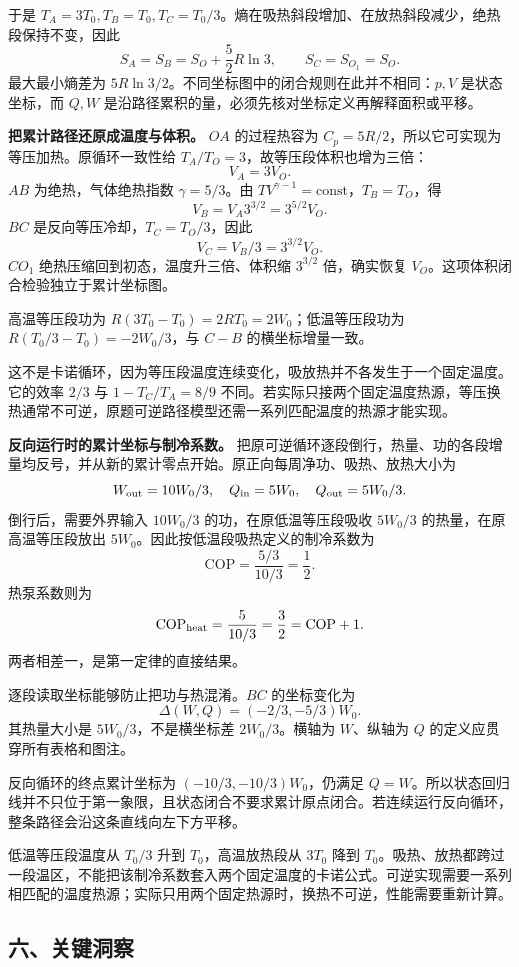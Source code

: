 \documentclass[12pt,a4paper,UTF8]{ctexart}
\begin{document}
于是
\(T_A=3T_0,T_B=T_0,T_C=T_0/3\)。熵在吸热斜段增加、在放热斜段减少，绝热段保持不变，因此
\[
S_A=S_B=S_O+\frac52R\ln3,
\qquad S_C=S_{O_1}=S_O.
\] 最大最小熵差为
\(5R\ln3/2\)。不同坐标图中的闭合规则在此并不相同：\(p,V\) 是状态坐标，而
\(Q,W\) 是沿路径累积的量，必须先核对坐标定义再解释面积或平移。

\textbf{把累计路径还原成温度与体积。} \(OA\) 的过程热容为
\(C_p=5R/2\)，所以它可实现为等压加热。原循环一致性给
\(T_A/T_O=3\)，故等压段体积也增为三倍： \[
V_A=3V_O.
\] \(AB\) 为绝热，气体绝热指数 \(\gamma=5/3\)。由
\(TV^{\gamma-1}=\mathrm{const}\)，\(T_B=T_O\)，得 \[
V_B=V_A3^{3/2}=3^{5/2}V_O.
\] \(BC\) 是反向等压冷却，\(T_C=T_O/3\)，因此 \[
V_C=V_B/3=3^{3/2}V_O.
\] \(CO_1\) 绝热压缩回到初态，温度升三倍、体积缩 \(3^{3/2}\)
倍，确实恢复 \(V_O\)。这项体积闭合检验独立于累计坐标图。

高温等压段功为 \(R(3T_0-T_0)=2RT_0=2W_0\)；低温等压段功为
\(R(T_0/3-T_0)=-2W_0/3\)，与 \(C-B\) 的横坐标增量一致。

这不是卡诺循环，因为等压段温度连续变化，吸放热并不各发生于一个固定温度。它的效率
\(2/3\) 与 \(1-T_C/T_A=8/9\)
不同。若实际只接两个固定温度热源，等压换热通常不可逆，原题可逆路径模型还需一系列匹配温度的热源才能实现。

\textbf{反向运行时的累计坐标与制冷系数。}
把原可逆循环逐段倒行，热量、功的各段增量均反号，并从新的累计零点开始。原正向每周净功、吸热、放热大小为
\[
W_{\rm out}=10W_0/3,
\quad Q_{\rm in}=5W_0,
\quad Q_{\rm out}=5W_0/3.
\] 倒行后，需要外界输入 \(10W_0/3\) 的功，在原低温等压段吸收 \(5W_0/3\)
的热量，在原高温等压段放出 \(5W_0\)。因此按低温段吸热定义的制冷系数为 \[
\mathrm{COP}=\frac{5/3}{10/3}=\frac12.
\] 热泵系数则为 \[
\mathrm{COP}_{\rm heat}=\frac5{10/3}=\frac32=\mathrm{COP}+1.
\] 两者相差一，是第一定律的直接结果。

逐段读取坐标能够防止把功与热混淆。\(BC\) 的坐标变化为 \[
\Delta(W,Q)=(-2/3,-5/3)W_0.
\] 其热量大小是 \(5W_0/3\)，不是横坐标差 \(2W_0/3\)。横轴为
\(W\)、纵轴为 \(Q\) 的定义应贯穿所有表格和图注。

反向循环的终点累计坐标为 \((-10/3,-10/3)W_0\)，仍满足
\(Q=W\)。所以状态回归线并不只位于第一象限，且状态闭合不要求累计原点闭合。若连续运行反向循环，整条路径会沿这条直线向左下方平移。

低温等压段温度从 \(T_0/3\) 升到 \(T_0\)，高温放热段从 \(3T_0\) 降到
\(T_0\)。吸热、放热都跨过一段温区，不能把该制冷系数套入两个固定温度的卡诺公式。可逆实现需要一系列相匹配的温度热源；实际只用两个固定热源时，换热不可逆，性能需要重新计算。

\subsection{六、关键洞察}\label{ux516dux5173ux952eux6d1eux5bdf-5}
\end{document}
